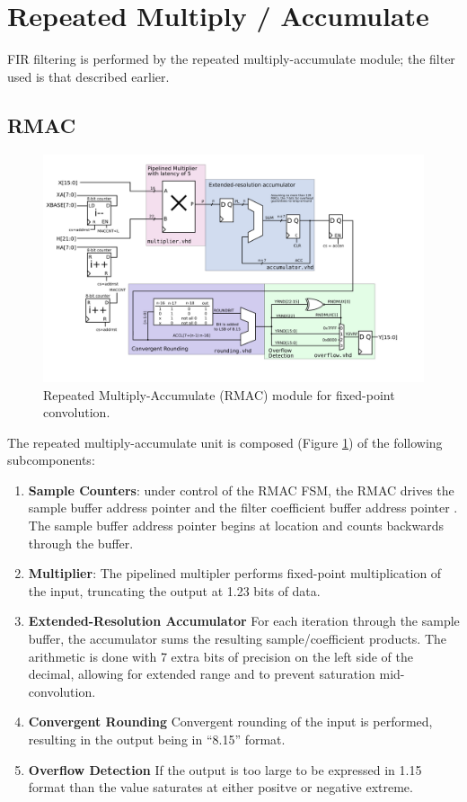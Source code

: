 \section{Repeated Multiply / Accumulate } 
FIR filtering is performed by the repeated multiply-accumulate module; the filter used is that described earlier. 

\subsection{RMAC}
\begin{figure}
\label{rmac}
\includegraphics[scale=1.0]{RMAC.svg}
\caption{Repeated Multiply-Accumulate (RMAC) module for fixed-point convolution.}
\end{figure} 
The repeated multiply-accumulate unit is composed (Figure \ref{rmac}) of the following subcomponents:

\begin{enumerate}
\item \textbf{Sample Counters}: under control of the RMAC FSM, the RMAC drives the sample buffer address pointer  and the filter coefficient buffer address pointer . The sample buffer address pointer begins at location  and counts backwards through the buffer. 
\item \textbf{Multiplier}: The pipelined multipler performs fixed-point multiplication of the input, truncating the output at 1.23 bits of data. 
\item \textbf{Extended-Resolution Accumulator} For each iteration through the sample buffer, the accumulator sums the resulting sample/coefficient products. The arithmetic is done with 7 extra bits of precision on the left side of the decimal, allowing for extended range and to prevent saturation mid-convolution. 
\item \textbf{Convergent Rounding} Convergent rounding of the input is performed, resulting in the output being in ``8.15'' format. 
\item \textbf{Overflow Detection} If the output is too large to be expressed in 1.15 format than the value saturates at either positve or negative extreme. 
\end{enumerate}


